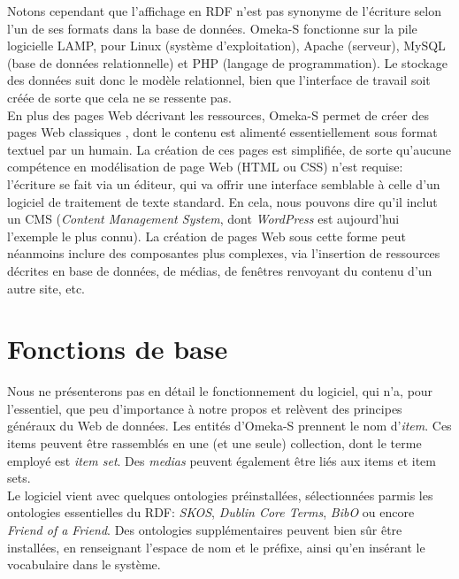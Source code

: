 \documentclass[a4paper,12pt,twoside]{book}
\begin{document}
Notons cependant que l'affichage en RDF n'est pas synonyme de l'écriture selon l'un de ses formats dans la base de données. Omeka-S fonctionne sur la pile logicielle LAMP, pour Linux (système d'exploitation), Apache (serveur), MySQL (base de données relationnelle) et PHP (langage de programmation). Le stockage des données suit donc le modèle relationnel, bien que l'interface de travail soit créée de sorte que cela ne se ressente pas.\\

En plus des pages Web décrivant les ressources, Omeka-S permet de créer des pages Web \og classiques \fg, dont le contenu est alimenté essentiellement sous format textuel par un humain. La création de ces pages est simplifiée, de sorte qu'aucune compétence en modélisation de page Web (HTML ou CSS) n'est requise: l'écriture se fait via un éditeur, qui va offrir une interface semblable à celle d'un logiciel de traitement de texte standard. En cela, nous pouvons dire qu'il inclut un CMS (\textit{Content Management System}, dont \textit{WordPress} est aujourd'hui l'exemple le plus connu). La création de pages Web sous cette forme peut néanmoins inclure des composantes plus complexes, via l'insertion de ressources décrites en base de données, de médias, de fenêtres renvoyant du contenu d'un autre site, etc.\\ 


\section{Fonctions de base}

Nous ne présenterons pas en détail le fonctionnement du logiciel, qui n'a, pour l'essentiel, que peu d'importance à notre propos et relèvent des principes généraux du Web de données. Les entités d'Omeka-S prennent le nom d'\textit{item}. Ces items peuvent être rassemblés en une (et une seule) collection, dont le terme employé est \textit{item set}. Des \textit{medias} peuvent également être liés aux items et item sets.\\

Le logiciel vient avec quelques ontologies préinstallées, sélectionnées parmis les ontologies essentielles du RDF: \textit{SKOS}, \textit{Dublin Core Terms}, \textit{BibO} ou encore \textit{Friend of a Friend}. Des ontologies supplémentaires peuvent bien sûr être installées, en renseignant l'espace de nom et le préfixe, ainsi qu'en insérant le vocabulaire dans le système.\\
\end{document}
